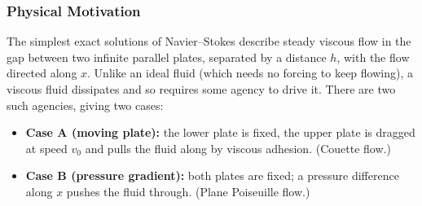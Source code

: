 \documentclass[../main.tex]{subfiles}
\begin{document}
\subsubsection*{Physical Motivation}
The simplest exact solutions of Navier--Stokes describe steady viscous flow in the gap between two infinite parallel plates, separated by a distance $h$, with the flow directed along $x$. Unlike an ideal fluid (which needs no forcing to keep flowing), a viscous fluid dissipates and so requires some agency to drive it. There are two such agencies, giving two cases:
\begin{itemize}
  \item \textbf{Case A (moving plate):} the lower plate is fixed, the upper plate is dragged at speed $v_0$ and pulls the fluid along by viscous adhesion. (Couette flow.)
  \item \textbf{Case B (pressure gradient):} both plates are fixed; a pressure difference along $x$ pushes the fluid through. (Plane Poiseuille flow.)
\end{itemize}
\end{document}
